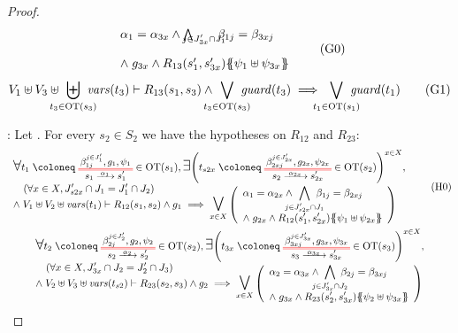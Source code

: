 \documentclass{article}
\begin{document}
\begin{proof}
\begin{multline}
{\begin{array}{l}
		\alpha_1 = \alpha_{3x} \wedge \bigwedge_\subbox{j \in J'_{3x} \cap J_1} \beta_{1j} = \beta_{3xj} \\[12pt]
		\nwedge g_{3x} \wedge R_{13}\mpar{s'_1, s'_{3x}}\psubst{\psi_1 \uplus \psi_{3x}}
	\end{array}} \goal{0}
\end{multline}
\[ V_1 \uplus V_3 \uplus \biguplus_\subbox{t_3 \in \fOT{s_3}} \fvars{t_3} \vdash R_{13}\mpar{s_1, s_3} \wedge \bigvee_\subbox{t_3 \in \fOT{s_3}} \fguard{t_3} \implies \bigvee_\subbox{t_1 \in \fOT{s_1}} \fguard{t_1} \goal{1} \]
\item[\goal{0}:] Let .
For every \(s_2 \in S_2\) we have the hypotheses on \(R_{12}\) and \(R_{23}\):
\begin{gather}
	\everymath{\displaystyle}\begin{array}{l}
	\bigsymb{\forall} t_1 \defobject \OTx{1}{}{1}{1} \in \fOT{s_1}, \bigsymb{\exists} \mpar{t_{s2x} \defobject \OTx{2}{x}{2x}{2x} \in \fOT{s_2}}^{x \in X}, \\
	\quad \mpar{\forall x \in X, J'_{s2x} \cap J_1 = J'_1 \cap J_2} \\[-10pt]
	\nwedge V_1 \uplus V_2 \uplus \fvars{t_1} \vdash R_{12}\mpar{s_1, s_2} \wedge g_1 \implies \operatorname*{\bigsymb{\bigvee}}_{x \in X} \mpar{\begin{array}{l}
		\alpha_1 = \alpha_{2x} \wedge \bigwedge_\subbox{j \in J'_{s2x} \cap J_1} \beta_{1j} = \beta_{2xj} \\[12pt]
		\nwedge g_{2x} \wedge R_{12}\mpar{s'_1, s'_{2x}}\psubst{\psi_1 \uplus \psi_{2x}}
	\end{array}}
	\end{array} \hyp{0} \\
	\everymath{\displaystyle}\begin{array}{l}
	\bigsymb{\forall} t_2 \defobject \OTx{2}{}{2}{2} \in \fOT{s_2}, \bigsymb{\exists} \mpar{t_{3x} \defobject \OTx{3}{x}{3x}{3x} \in \fOT{s_3}}^{x \in X}, \\
	\quad \mpar{\forall x \in X, J'_{3x} \cap J_2 = J'_2 \cap J_3} \\[-10pt]
	\nwedge V_2 \uplus V_3 \uplus \fvars{t_{s2}} \vdash R_{23}\mpar{s_2, s_3} \wedge g_2 \implies \operatorname*{\bigsymb{\bigvee}}_{x \in X} \mpar{\begin{array}{l}
		\alpha_2 = \alpha_{3x} \wedge \bigwedge_\subbox{j \in J'_{3x} \cap J_2} \beta_{2j} = \beta_{3xj} \\[12pt]
		\nwedge g_{3x} \wedge R_{23}\mpar{s'_2, s'_{3x}}\psubst{\psi_2 \uplus \psi_{3x}}

\end{array}}
\end{array}
\end{gather}
\end{proof}
\end{document}
